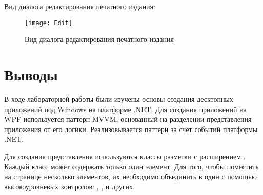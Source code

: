 \documentclass[a4paper,14pt]{extarticle}
\begin{document}
Вид диалога редактирования печатного издания:
\begin{figure}[H]
    \centering
    \texttt{[image: Edit]}
    \caption{Вид диалога редактирования печатного издания}
    \label{fig:edit}
\end{figure}

\section*{Выводы}
В ходе лабораторной работы были изучены основы создания десктопных приложений под Windows
на платформе .NET. Для создания приложений на WPF используется паттерн MVVM, основанный на
разделении представления приложения от его логики. Реализовывается паттерн за счет событий
платформы .NET.

Для создания представления используются классы разметки с расширением . Каждый класс
может содержать только один элемент. Для того, чтобы поместить на странице несколько элементов,
их необходимо объединить в один с помощью высокоуровневых контролов: , ,
 и других.
\end{document}
